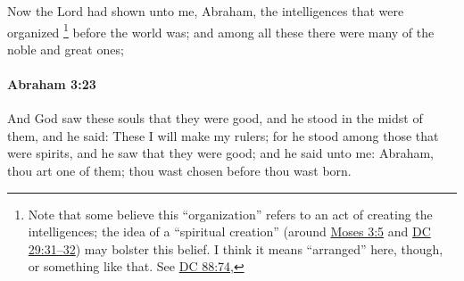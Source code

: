 			Now the Lord had shown unto me, Abraham, the intelligences that were organized%
				\footnote{%
					Note that some believe this ``organization'' refers to an act of creating the intelligences; the idea of a ``spiritual creation'' (around \hyperref[MOSES-3-5]{Moses 3:5} and \hyperref[DC29-31]{DC 29:31--32}) may bolster this belief. I think it means ``arranged'' here, though, or something like that. See \hyperref[DC88-74]{DC 88:74}, 
					}
			before the world was; and among all these there were many of the noble and great ones;


		\paragraph{Abraham 3:23} %
			\label{ABRAHAM-3-23}

			And God saw these souls that they were good, and he stood in the midst of them, and he said: These I will make my rulers; for he stood among those that were spirits, and he saw that they were good; and he said unto me: Abraham, thou art one of them; thou wast chosen before thou wast born.


